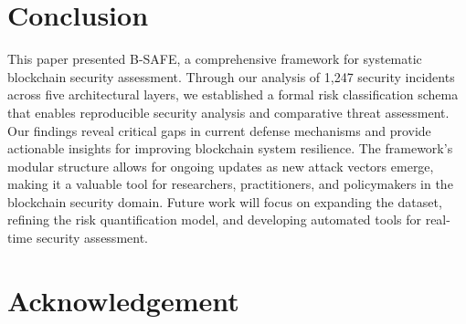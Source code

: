 \documentclass[a4paper]{article}
\begin{document}
\begin{multicols}{2}


\section{Conclusion}
This paper presented B-SAFE, a comprehensive framework for systematic blockchain security assessment. Through our analysis of 1,247 security incidents across five architectural layers, we established a formal risk classification schema that enables reproducible security analysis and comparative threat assessment. Our findings reveal critical gaps in current defense mechanisms and provide actionable insights for improving blockchain system resilience. The framework's modular structure allows for ongoing updates as new attack vectors emerge, making it a valuable tool for researchers, practitioners, and policymakers in the blockchain security domain. Future work will focus on expanding the dataset, refining the risk quantification model, and developing automated tools for real-time security assessment. 

\section*{Acknowledgement}


\nocite{ChenYao2022,Deloitte2000,Scribbr2020,SlatWorp2019,SlatWorpHolierhoekND,Launiainen2018,Karatas2021,MarahChallenger2023}


\end{multicols}
\end{document}
